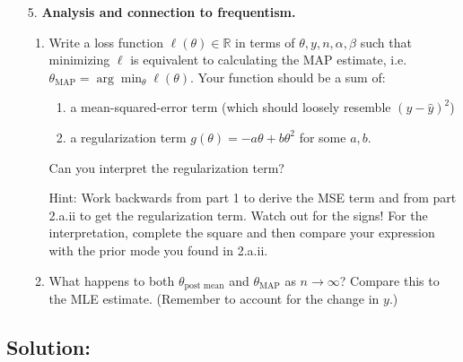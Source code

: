 \documentclass[submit]{harvardml}
\begin{document}
\begin{framed}
\begin{enumerate}
  \item[5.]
    \textbf{Analysis and connection to frequentism.}
  
    \begin{enumerate}
    \item
      Write a loss function \(\ell(\theta) \in \mathbb{R}\) in terms of
      \(\theta, y, n, \alpha, \beta\) such that minimizing \(\ell\) is
      equivalent to calculating the MAP estimate,
      i.e.~\(\theta_{\text{MAP}} = \arg \min_{\theta} \ell(\theta)\). Your
      function should be a sum of:
      \begin{enumerate}
        \item a mean-squared-error term (which should loosely resemble $(y - \hat y)^2$)
        \item a
        regularization term \(g(\theta) = - a \theta + b \theta^{2}\) for some $a, b$.
      \end{enumerate}
      
      Can you interpret the regularization term? 
      
      Hint: Work backwards from part 1 to derive the MSE term and from part 2.a.ii to get the regularization term. Watch out for the signs! For the interpretation, complete the square and then compare your expression with the prior mode you found in 2.a.ii.
    \item
      What happens to both $\theta_{\text{post mean}}$ and $\theta_{\text{MAP}}$ as \(n \to \infty\)? Compare this to the MLE estimate.
      (Remember to account for the change in \(y\).)
    \end{enumerate}
  
\end{enumerate}

\end{framed}

\subsection*{Solution:}
\end{document}

